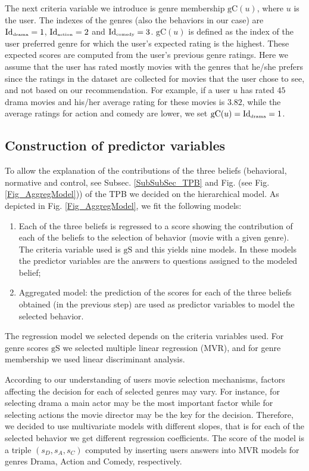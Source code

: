\documentclass{llncs}
\def\gS{{\mbox{gS}}}
\def\gC{{\mbox{gC}}}
\def\Id{{\mbox{Id}}}
\begin{document}
The next criteria variable we introduce is genre membership $\gC(u)$, where $u$ is the user. The indexes of the genres (also the behaviors in our case) are $\Id_{\mbox{\tiny drama}}=1$, $\Id_{\mbox{\tiny action}}=2$ and $\Id_{\mbox{\tiny comedy}}=3$. $\gC(u)$ is defined as the index of the user preferred genre for which the user's expected rating is the highest. These expected scores are computed from the user's previous genre ratings. Here we assume that the user has rated mostly movies with the genres that he/she prefers since the ratings in the dataset are collected for movies that the user chose to see, and not based on our recommendation.  For example, if a user $u$ has rated $45$ drama movies and his/her average rating for these movies is $3.82$, while the average ratings for action and comedy are lower, we set $\gC(u)=\Id_{\mbox{\tiny drama}}=1$.
 
\subsection{Construction of predictor variables}\label{SubSec_PredVarConstr} 

To allow the explanation of the contributions of the three beliefs (behavioral, normative and control, see Subsec.  \ref{SubSubSec_TPB} and Fig. (see Fig. \ref{Fig_AggregModel})) of the TPB we decided on the hierarchical model. As depicted in Fig. \ref{Fig_AggregModel}, we fit the following models:  
\begin{enumerate}
 \item Each of the three beliefs is regressed to a score showing the contribution of each of the beliefs to the selection of behavior (movie with a given genre). The criteria variable used is $\gS$ and this yields nine models. In these models the predictor variables are the answers to questions assigned to the modeled belief; 
 \item Aggregated model: the prediction of the scores for each of the three beliefs obtained (in the previous step) are used as predictor variables to model the selected behavior. 
\end{enumerate}
The regression model we selected depends on the criteria variables used. For genre scores $\gS$ we selected multiple linear regression (MVR), and for genre membership we used linear discriminant analysis.
 
According to our understanding of users movie selection mechanisms, factors affecting the decision for each of selected genres may vary. For instance, for selecting drama a main actor may be the most important factor while for selecting actions the movie director   may be the key for the decision. Therefore, we decided to use multivariate models with different slopes, that is for each of the selected behavior we get different regression coefficients. The score of the model is a triple $(s_D, s_A, s_C)$ computed by inserting users answers into MVR models for genres Drama, Action and Comedy, respectively.  
\end{document}
